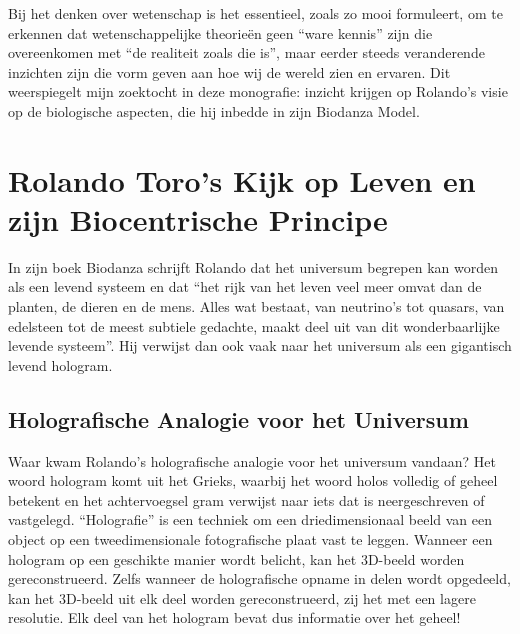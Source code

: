 \documentclass[
  11pt,
]{book}
\begin{document}
Bij het denken over wetenschap is het essentieel, zoals \citet{bohm1980} zo mooi formuleert, om te erkennen dat wetenschappelijke theorieën geen ``ware kennis'' zijn die overeenkomen met ``de realiteit zoals die is'', maar eerder steeds veranderende inzichten zijn die vorm geven aan hoe wij de wereld zien en ervaren. Dit weerspiegelt mijn zoektocht in deze monografie: inzicht krijgen op Rolando's visie op de biologische aspecten, die hij inbedde in zijn Biodanza Model.

\section{Rolando Toro's Kijk op Leven en zijn Biocentrische Principe}\label{rolando-toros-kijk-op-leven-en-zijn-biocentrische-principe}

In zijn boek Biodanza schrijft Rolando dat het universum begrepen kan worden als een levend systeem en dat ``het rijk van het leven veel meer omvat dan de planten, de dieren en de mens. Alles wat bestaat, van neutrino's tot quasars, van edelsteen tot de meest subtiele gedachte, maakt deel uit van dit wonderbaarlijke levende systeem''.
Hij verwijst dan ook vaak naar het universum als een gigantisch levend hologram.

\subsection{Holografische Analogie voor het Universum}\label{holografische-analogie-voor-het-universum}

Waar kwam Rolando's holografische analogie voor het universum vandaan? Het woord hologram komt uit het Grieks, waarbij het woord holos volledig of geheel betekent en het achtervoegsel gram verwijst naar iets dat is neergeschreven of vastgelegd. ``Holografie'' is een techniek om een driedimensionaal beeld van een object op een tweedimensionale fotografische plaat vast te leggen. Wanneer een hologram op een geschikte manier wordt belicht, kan het 3D-beeld worden gereconstrueerd. Zelfs wanneer de holografische opname in delen wordt opgedeeld, kan het 3D-beeld uit elk deel worden gereconstrueerd, zij het met een lagere resolutie. Elk deel van het hologram bevat dus informatie over het geheel!
\end{document}
